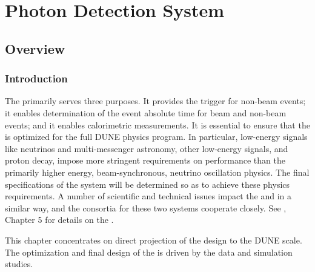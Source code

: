 \chapter{Photon Detection System}
\label{ch:fddp-pd}

\section{Overview}
\label{sec:fddp-pd-1}

\subsection{Introduction}
\label{sec:fddp-pd-1.1}

The   primarily serves three purposes. It provides the trigger for non-beam events; it enables determination of the event absolute time for beam and non-beam events; and it enables calorimetric measurements. 
It is essential to ensure that the \dual {} is optimized for the full DUNE physics program. In particular, low-energy signals like  neutrinos and multi-messenger astronomy, other low-energy signals, and proton decay, %
impose more stringent requirements on  performance than the primarily higher energy, beam-synchronous, neutrino oscillation physics. The final specifications of the system will be determined so as to achieve these physics requirements. 
A number of scientific and technical issues impact the \dual {}  and \single {}  in a similar way, and the consortia for these two systems cooperate closely.  See \voltitlespfd{}, Chapter 5 for details on the \single {}.

This %
 chapter concentrates on direct projection of the  design to the DUNE scale. The optimization and final design of the \dual {} is driven by the  \cite{protoDUNDP-tdr} data and simulation studies.

